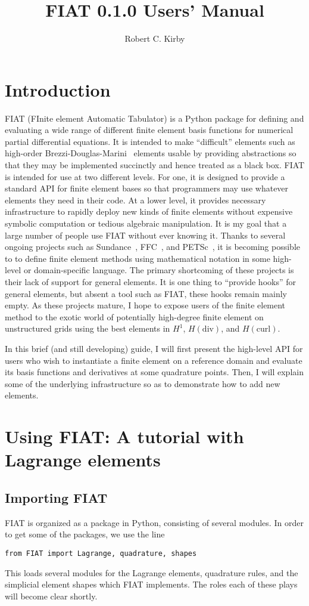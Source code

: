 \documentclass[12pt]{article}
\title{FIAT 0.1.0 Users' Manual}
\author{Robert C. Kirby}
\begin{document}
\maketitle

\section{Introduction}
FIAT (FInite element Automatic Tabulator) is a Python package for
defining and evaluating a wide range of different finite element basis
functions for numerical partial differential equations.  It is
intended to make ``difficult'' elements such as high-order
Brezzi-Douglas-Marini~\cite{} elements usable by providing
abstractions so that they may be implemented succinctly and hence
treated as a black box.  FIAT is intended for use at two different
levels.  For one, it is designed to provide a standard API for finite
element bases so that programmers may use whatever elements they need
in their code.  At a lower level, it provides necessary infrastructure to
rapidly deploy new kinds of finite elements without expensive symbolic
computation or tedious algebraic manipulation.
It is my goal that a large number of people use FIAT without ever
knowing it.  Thanks to several ongoing projects such as
Sundance~\cite{}, FFC~\cite{}, and PETSc~\cite{}, it is becoming
possible to to define finite element methods using mathematical
notation in some high-level or domain-specific language.  The primary
shortcoming of these projects is their lack of support for general
elements.  It is one thing to ``provide hooks'' for general elements,
but absent a tool such as FIAT, these hooks remain mainly empty.  As
these projects mature, I hope to expose users of the finite element
method to the exotic world of potentially high-degree finite element
on unstructured grids using the best elements in $H^1$,
$H(\mathrm{div})$, and $H(\mathrm{curl})$.

In this brief (and still developing) guide, I will first
present the high-level API for users who wish to instantiate a finite
element on a reference domain and evaluate its basis functions and
derivatives at some quadrature points.  Then, I will explain some of
the underlying infrastructure so as to demonstrate how to add new
elements.

\section{Using FIAT: A tutorial with Lagrange elements}
\subsection{Importing FIAT}
FIAT is organized as a package in Python, consisting of several
modules.  In order to get some of the packages, we use the line
\begin{verbatim}
from FIAT import Lagrange, quadrature, shapes
\end{verbatim}
This loads several modules for the Lagrange elements, quadrature
rules, and the simplicial element shapes which FIAT implements.  The
roles each of these plays will become clear shortly.
\end{document}
